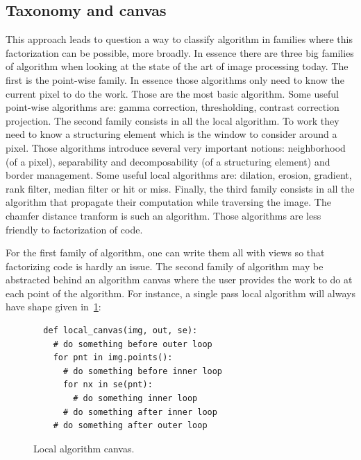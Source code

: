 \subsection{Taxonomy and canvas}
\label{subsec.taxonomy.canvas}

This approach leads to question a way to classify algorithm in families where this factorization can be possible, more
broadly. In essence there are three big families of algorithm when looking at the state of the art of image processing
today. The first is the point-wise family. In essence those algorithms only need to know the current pixel to do the
work. Those are the most basic algorithm. Some useful point-wise algorithms are: gamma correction, thresholding,
contrast correction projection. The second family consists in all the local algorithm. To work they need to know a
structuring element which is the window to consider around a pixel. Those algorithms introduce several very important
notions: neighborhood (of a pixel), separability and decomposability (of a structuring element) and border management.
Some useful local algorithms are: dilation, erosion, gradient, rank filter, median filter or hit or miss. Finally, the
third family consists in all the algorithm that propagate their computation while traversing the image. The chamfer
distance tranform is such an algorithm. Those algorithms are less friendly to factorization of code.

For the first family of algorithm, one can write them all with views so that factorizing code is hardly an issue. The
second family of algorithm may be abstracted behind an algorithm canvas where the user provides the work to do at each
point of the algorithm. For instance, a single pass local algorithm will always have shape given
in~\ref{code:local.algorithm.canvas}:

\begin{figure}[tbh]
  \centering
  \begin{verbatim}
  def local_canvas(img, out, se):
    # do something before outer loop
    for pnt in img.points():
      # do something before inner loop
      for nx in se(pnt):
        # do something inner loop
      # do something after inner loop
    # do something after outer loop
  \end{verbatim}

  \caption{Local algorithm canvas.}
  \label{code:local.algorithm.canvas}
\end{figure}


